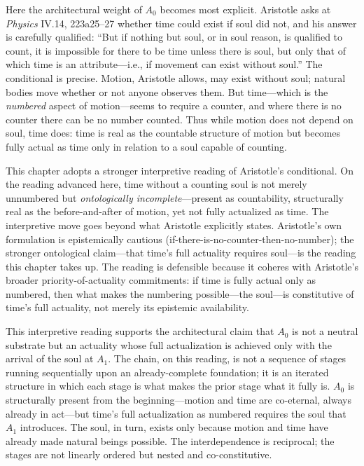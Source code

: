 Here the architectural weight of $A_0$ becomes most explicit. Aristotle asks at \textit{Physics} IV.14, 223a25--27 whether time could exist if soul did not, and his answer is carefully qualified: ``But if nothing but soul, or in soul reason, is qualified to count, it is impossible for there to be time unless there is soul, but only that of which time is an attribute---i.e., if movement can exist without soul.'' The conditional is precise. Motion, Aristotle allows, may exist without soul; natural bodies move whether or not anyone observes them. But time---which is the \textit{numbered} aspect of motion---seems to require a counter, and where there is no counter there can be no number counted. Thus while motion does not depend on soul, time does: time is real as the countable structure of motion but becomes fully actual as time only in relation to a soul capable of counting.

This chapter adopts a stronger interpretive reading of Aristotle's conditional. On the reading advanced here, time without a counting soul is not merely unnumbered but \textit{ontologically incomplete}---present as countability, structurally real as the before-and-after of motion, yet not fully actualized as time. The interpretive move goes beyond what Aristotle explicitly states. Aristotle's own formulation is epistemically cautious (if-there-is-no-counter-then-no-number); the stronger ontological claim---that time's full actuality requires soul---is the reading this chapter takes up. The reading is defensible because it coheres with Aristotle's broader priority-of-actuality commitments: if time is fully actual only as numbered, then what makes the numbering possible---the soul---is constitutive of time's full actuality, not merely its epistemic availability.

This interpretive reading supports the architectural claim that $A_0$ is not a neutral substrate but an actuality whose full actualization is achieved only with the arrival of the soul at $A_1$. The chain, on this reading, is not a sequence of stages running sequentially upon an already-complete foundation; it is an iterated structure in which each stage is what makes the prior stage what it fully is. $A_0$ is structurally present from the beginning---motion and time are co-eternal, always already in act---but time's full actualization as numbered requires the soul that $A_1$ introduces. The soul, in turn, exists only because motion and time have already made natural beings possible. The interdependence is reciprocal; the stages are not linearly ordered but nested and co-constitutive.

